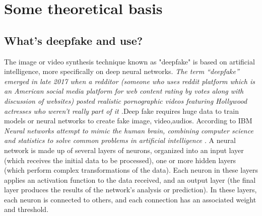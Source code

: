 \section{ Some theoretical basis}
\subsection{What’s deepfake and use?}
 The image or video synthesis technique known as "deepfake" is based on artificial intelligence, more specifically on deep neural networks.  \emph{The term “deepfake” emerged in late 2017 when a redditor (someone who uses reddit platform which is an American social media platform for web content rating by votes along with discussion of websites) posted realistic pornographic videos featuring Hollywood actresses who weren’t really part of it \cite{negiDeepFakeUnderstanding2021} .}Deep fake requires huge data to train models or neural networks to create fake image, video,audios. According to IBM \cite{IBM2023} \emph{Neural networks attempt to mimic the human brain, combining computer science and statistics to solve common problems in artificial intelligence \cite{QuEstceQu}}. A neural network is made up of several layers of neurons, organized into an input layer (which receives the initial data to be processed), one or more hidden layers (which perform complex transformations of the data). Each neuron in these layers applies an activation function to the data received, and an output layer (the final layer produces the results of the network's analysis or prediction). In these layers, each neuron is connected to others, and each connection has an associated weight and threshold.

